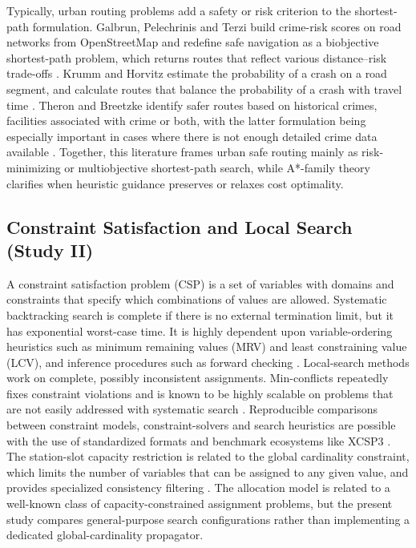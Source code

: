 \documentclass{ai-lab-report}
\begin{document}
Typically, urban routing problems add a safety or risk criterion to the shortest-path formulation. Galbrun, Pelechrinis and Terzi build crime-risk scores on road networks from OpenStreetMap and redefine safe navigation as a biobjective shortest-path problem, which returns routes that reflect various distance--risk trade-offs \citep{galbrun2016safepaths}. Krumm and Horvitz estimate the probability of a crash on a road segment, and calculate routes that balance the probability of a crash with travel time \citep{krumm2017riskaware}. Theron and Breetzke identify safer routes based on historical crimes, facilities associated with crime or both, with the latter formulation being especially important in cases where there is not enough detailed crime data available \citep{theron2024safest}. Together, this literature frames urban safe routing mainly as risk-minimizing or multiobjective shortest-path search, while A*-family theory clarifies when heuristic guidance preserves or relaxes cost optimality.

\subsection{Constraint Satisfaction and Local Search (Study II)}

A constraint satisfaction problem (CSP) is a set of variables with domains and constraints that specify which combinations of values are allowed. Systematic backtracking search is complete if there is no external termination limit, but it has exponential worst-case time. It is highly dependent upon variable-ordering heuristics such as minimum remaining values (MRV) and least constraining value (LCV), and inference procedures such as forward checking \citep{haralick1980increasing,russell2021ai}. Local-search methods work on complete, possibly inconsistent assignments. Min-conflicts repeatedly fixes constraint violations and is known to be highly scalable on problems that are not easily addressed with systematic search \citep{minton1992conflicts}. Reproducible comparisons between constraint models, constraint-solvers and search heuristics are possible with the use of standardized formats and benchmark ecosystems like XCSP3 \citep{audemard2020xcsp3}. The station-slot capacity restriction is related to the global cardinality constraint, which limits the number of variables that can be assigned to any given value, and provides specialized consistency filtering \citep{regin1996global}. The allocation model is related to a well-known class of capacity-constrained assignment problems, but the present study compares general-purpose search configurations rather than implementing a dedicated global-cardinality propagator.
\end{document}
